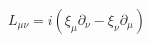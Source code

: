 \begin{equation}
L_{\mu \nu} = i(\xi_{\mu} \partial_{\nu} - \xi_{\nu} \partial_{\mu})
\end{equation}

